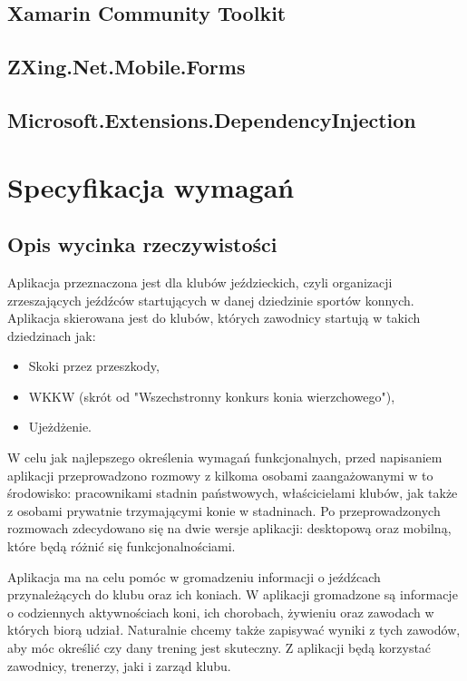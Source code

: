 \documentclass[12pt,twoside]{report}
\begin{document}
\section{Xamarin Community Toolkit}

\section{ZXing.Net.Mobile.Forms}

\section{Microsoft.Extensions.DependencyInjection}
\chapter{Specyfikacja wymagań}
\section{Opis wycinka rzeczywistości}
Aplikacja przeznaczona jest dla klubów jeździeckich, czyli organizacji zrzeszających jeźdźców startujących w danej dziedzinie sportów konnych. Aplikacja skierowana jest do klubów, których zawodnicy startują w takich dziedzinach jak:
\begin{itemize}
	\item Skoki przez przeszkody,
	\item WKKW (skrót od "Wszechstronny konkurs konia wierzchowego"),
	\item Ujeżdżenie.
\end{itemize}

W celu jak najlepszego określenia wymagań funkcjonalnych, przed napisaniem aplikacji przeprowadzono rozmowy z kilkoma osobami zaangażowanymi w to środowisko: pracownikami stadnin państwowych, właścicielami klubów, jak także z osobami prywatnie trzymającymi konie w stadninach. Po przeprowadzonych rozmowach zdecydowano się na dwie wersje aplikacji: desktopową oraz mobilną, które będą różnić się funkcjonalnościami.

Aplikacja ma na celu pomóc w gromadzeniu informacji o jeźdźcach przynależących do klubu oraz ich koniach. W aplikacji gromadzone są informacje o codziennych aktywnościach koni, ich chorobach, żywieniu oraz zawodach w których biorą udział. Naturalnie chcemy także zapisywać wyniki z tych zawodów, aby móc określić czy dany trening jest skuteczny. Z aplikacji będą korzystać zawodnicy, trenerzy, jaki i zarząd klubu.
\end{document}
